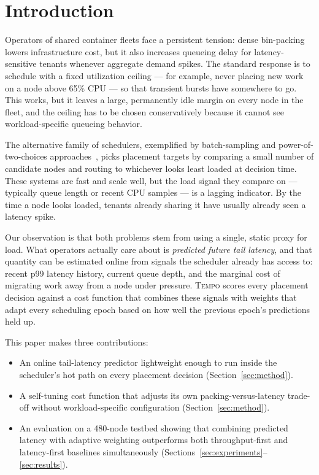 \section{Introduction}
\label{sec:intro}

Operators of shared container fleets face a persistent tension: dense
bin-packing lowers infrastructure cost, but it also increases queueing delay
for latency-sensitive tenants whenever aggregate demand spikes. The standard
response is to schedule with a fixed utilization ceiling --- for example,
never placing new work on a node above 65\% CPU --- so that transient bursts
have somewhere to go. This works, but it leaves a large, permanently idle
margin on every node in the fleet, and the ceiling has to be chosen
conservatively because it cannot see workload-specific queueing behavior.

The alternative family of schedulers, exemplified by batch-sampling and
power-of-two-choices approaches~\cite{holm2018batch,chen2019placement},
picks placement targets by comparing a small number of candidate nodes and
routing to whichever looks least loaded at decision time. These systems are
fast and scale well, but the load signal they compare on --- typically queue
length or recent CPU samples --- is a lagging indicator. By the time a node
looks loaded, tenants already sharing it have usually already seen a latency
spike.

Our observation is that both problems stem from using a single, static proxy
for load. What operators actually care about is \emph{predicted future tail
latency}, and that quantity can be estimated online from signals the
scheduler already has access to: recent p99 latency history, current queue
depth, and the marginal cost of migrating work away from a node under
pressure. \textsc{Tempo} scores every placement decision against a cost
function that combines these signals with weights that adapt every
scheduling epoch based on how well the previous epoch's predictions held up.

This paper makes three contributions:

\begin{itemize}[noitemsep,topsep=2pt,leftmargin=1.4em]
  \item An online tail-latency predictor lightweight enough to run inside
    the scheduler's hot path on every placement decision (Section~\ref{sec:method}).
  \item A self-tuning cost function that adjusts its own packing-versus-latency
    trade-off without workload-specific configuration (Section~\ref{sec:method}).
  \item An evaluation on a 480-node testbed showing that combining
    predicted latency with adaptive weighting outperforms both
    throughput-first and latency-first baselines simultaneously
    (Sections~\ref{sec:experiments}--\ref{sec:results}).
\end{itemize}

